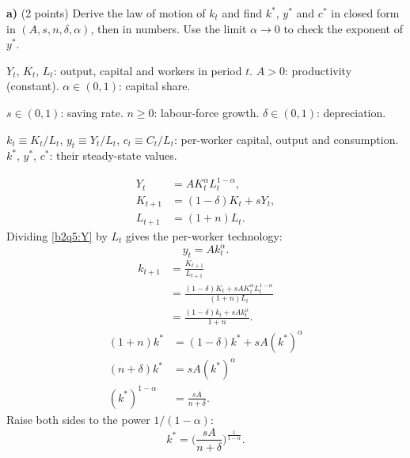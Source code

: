 \textbf{a)} (2 points) Derive the law of motion of $k_t$ and find $k^*$, $y^*$ and $c^*$ in closed form in $(A,s,n,\delta,\alpha)$, then in
numbers. Use the limit $\alpha\to0$ to check the exponent of $y^*$.
\resolespaco
\begin{sol}
\begin{notacao}
\item $Y_t$, $K_t$, $L_t$: output, capital and workers in period $t$. $A>0$: productivity (constant). $\alpha\in(0,1)$: capital share.
\item $s\in(0,1)$: saving rate. $n\ge0$: labour-force growth. $\delta\in(0,1)$: depreciation.
\item $k_t\equiv K_t/L_t$, $y_t\equiv Y_t/L_t$, $c_t\equiv C_t/L_t$: per-worker capital, output and consumption.
$k^*$, $y^*$, $c^*$: their steady-state values.
\end{notacao}
\begin{align}
Y_t&=AK_t^{\alpha}L_t^{1-\alpha}, \label{b2q5:Y}\\
K_{t+1}&=(1-\delta)K_t+sY_t, \label{b2q5:K}\\
L_{t+1}&=(1+n)L_t. \label{b2q5:L}
\end{align}
Dividing \eqref{b2q5:Y} by $L_t$ gives the per-worker technology:
\begin{equation}
y_t=Ak_t^{\alpha}. \label{b2q5:y}
\end{equation}
\begin{align}
k_{t+1}&=\frac{K_{t+1}}{L_{t+1}}\nonumber\\
&=\frac{(1-\delta)K_t+sAK_t^{\alpha}L_t^{1-\alpha}}{(1+n)L_t}\nonumber\\
&=\frac{(1-\delta)k_t+sAk_t^{\alpha}}{1+n}. \label{b2q5:lom}
\end{align}
\begin{align}
(1+n)k^*&=(1-\delta)k^*+sA(k^*)^{\alpha}\nonumber\\
(n+\delta)k^*&=sA(k^*)^{\alpha} \label{b2q5:be}\\
(k^*)^{1-\alpha}&=\frac{sA}{n+\delta}. \nonumber
\end{align}
Raise both sides to the power $1/(1-\alpha)$:
\begin{equation}
k^*=\Big(\frac{sA}{n+\delta}\Big)^{\frac1{1-\alpha}}. \label{b2q5:kss}
\end{equation}

\end{sol}
